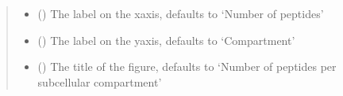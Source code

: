 \documentclass[letterpaper,10pt,english]{sphinxmanual}
\begin{document}
\begin{fulllineitems}
\begin{quote}
\begin{description}
\begin{itemize}
\item {} 
 (\sphinxstyleliteralemphasis{\sphinxupquote{, }}) \textendash{} The label on the x\sphinxhyphen{}axis, defaults to ‘Number of peptides’

\item {} 
 (\sphinxstyleliteralemphasis{\sphinxupquote{, }}) \textendash{} The label on the y\sphinxhyphen{}axis, defaults to ‘Compartment’

\item {} 
 (\sphinxstyleliteralemphasis{\sphinxupquote{, }}) \textendash{} The title of the figure, defaults to ‘Number of peptides per sub\sphinxhyphen{}cellular compartment’

\end{itemize}

\end{description}\end{quote}

\end{fulllineitems}

\end{document}
